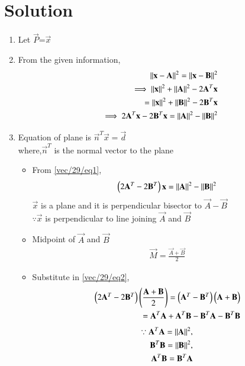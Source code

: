 \documentclass[journal,12pt,twocolumn]{IEEEtran}
\newcommand{\myvec}[1]{\ensuremath{\begin{pmatrix}#1\end{pmatrix}}}
\begin{document}
\section{Solution}
\begin{enumerate}
\item Let $\vec{P}$=$\vec{x}$\\
\item From the given information,
\begin{align}
\Vert\mathbf{x}-\mathbf{A}\rVert^2=\Vert\mathbf{x}-\mathbf{B}\rVert^2
\\
\implies\Vert\mathbf{x}\rVert^2+\Vert\mathbf{A}\rVert^2-2\mathbf{A}^T\mathbf{x}
\\
=\Vert\mathbf{x}\rVert^2+\Vert\mathbf{B}\rVert^2-2\mathbf{B}^T\mathbf{x}
\\
\implies 2\mathbf{A}^T\mathbf{x}-2\mathbf{B}^T\mathbf{x}=\Vert\mathbf{A}\rVert^2-\Vert\mathbf{B}\rVert^2  \label{vec/29/eq1}
\end{align}
\item Equation of plane is $\vec{n}^T\vec{x}=\vec{d}$
\\
where,$\vec{n}^T$ is the normal vector to the plane 
\begin{itemize}
\item From \eqref{vec/29/eq1},
\begin{align}
\myvec{2\vec{A}^T-2\vec{B}^T}\vec{x}=\norm{\vec{A}}^2-\norm{\vec{B}}^2 \label{vec/29/eq2}
\end{align}
$\vec{x}$ is a plane and it is perpendicular bisector to $\vec{A}-\vec{B}$
\\
$\because\vec{x}$ is perpendicular to line joining $\vec{A}$ and $\vec{B}$
\item Midpoint of $\vec{A}$ and $\vec{B}$
\begin{align}
\vec{M}= \frac{\vec{A}+\vec{B}}{2}
\end{align}
\item Substitute in \eqref{vec/29/eq2},
\begin{align}
\myvec{2\vec{A}^T-2\vec{B}^T}\brak{\frac{\vec{A}+\vec{B}}{2}}
=\myvec{\vec{A}^T-\vec{B}^T}\myvec{\vec{A}+\vec{B}}
\\
=\vec{A}^T\vec{A}+\vec{A}^T\vec{B}-\vec{B}^T\vec{A}-\vec{B}^T\vec{B}
\end{align}
\begin{align}
\because \mathbf{A}^T\mathbf{A}=\Vert\mathbf{A}\rVert^2,
\\
\mathbf{B}^T\mathbf{B}=\Vert\mathbf{B}\rVert^2,
\\
\mathbf{A}^T\mathbf{B}=\mathbf{B}^T\mathbf{A}
\end{align}
\begin{align}

\end{align}
\end{itemize}
\end{enumerate}
\end{document}
